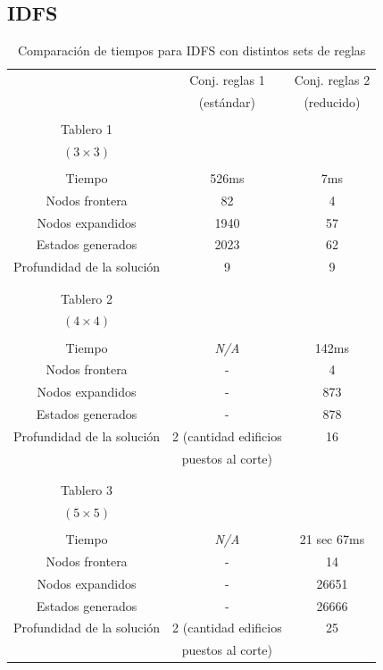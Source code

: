 \documentclass[%
	final,
	reprint,
	notitlepage,
	narroweqnarray,
	inline,
	twoside,
	invited
	]{ieee}
\begin{document}
\clearpage

\subsection{IDFS}

\begin{table}[H]
\begin{center}
\begin{tabular}{|c|c|c|}
\hline
 & Conj. reglas 1 &  Conj. reglas 2\\
 & (estándar) &  (reducido)\\

\hline
\hline

&&\\
Tablero 1 & & \\
$(3\times 3)$ & & \\
&&\\
\hline
Tiempo & 526ms & 7ms \\
\hline
Nodos frontera & 82 & 4 \\
\hline
Nodos expandidos & 1940 & 57 \\
\hline
Estados generados & 2023 & 62 \\
\hline
Profundidad de la solución & 9 & 9 \\
\hline
&&\\

\hline
\hline

&&\\
Tablero 2 & & \\
$(4\times 4)$ & & \\
&&\\
\hline
Tiempo & \textit{N/A} & 142ms \\
\hline
Nodos frontera & - & 4 \\
\hline
Nodos expandidos & - & 873 \\
\hline
Estados generados & - & 878 \\
\hline
Profundidad de la solución & 2 (cantidad edificios  & 16 \\
&puestos al corte)&\\
\hline
&&\\

\hline
\hline

&&\\
Tablero 3 & & \\
$(5\times 5)$ & & \\
&&\\
\hline
Tiempo & \textit{N/A} & 21 sec 67ms \\
\hline
Nodos frontera & - & 14 \\
\hline
Nodos expandidos & - & 26651 \\
\hline
Estados generados & - & 26666 \\
\hline
Profundidad de la solución & 2 (cantidad edificios  & 25 \\
&puestos al corte)&\\

\hline  
\end{tabular}
\end{center}
\caption{Comparación de tiempos para IDFS con distintos sets de reglas}\label{tablaIDFS}
\end{table}
\end{document}
